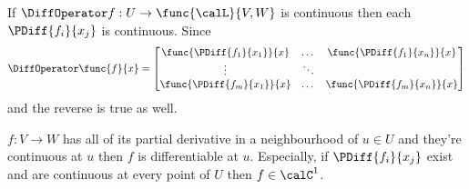 \begin{remark}
    If \(\DiffOperator f: U \to \func{\calL}{V,W}\) is continuous then each \(\PDiff{f_i}{x_j}\) is continuous. Since
    \begin{equation*}
        \DiffOperator \func{f}{x} = \begin{bmatrix}
            \func{\PDiff{f_1}{x_1}}{x} & \dots  & \func{\PDiff{f_1}{x_n}}{x} \\
            \vdots                     & \ddots &                            \\
            \func{\PDiff{f_m}{x_1}}{x} & \dots  & \func{\PDiff{f_m}{x_n}}{x}
        \end{bmatrix}
    \end{equation*}
    and the reverse is true as well.
\end{remark}

\begin{theorem} \label{th:DifferentiabilityCriteria}
    \(f : V \to W\) has all of its partial derivative in a neighbourhood of \(u \in U\) and they're continuous at \(u\) then \(f\) is differentiable at \(u\). Especially, if \(\PDiff{f_i}{x_j}\) exist and are continuous at every point of \(U\) then \(f \in \calC^1\).
\end{theorem}

